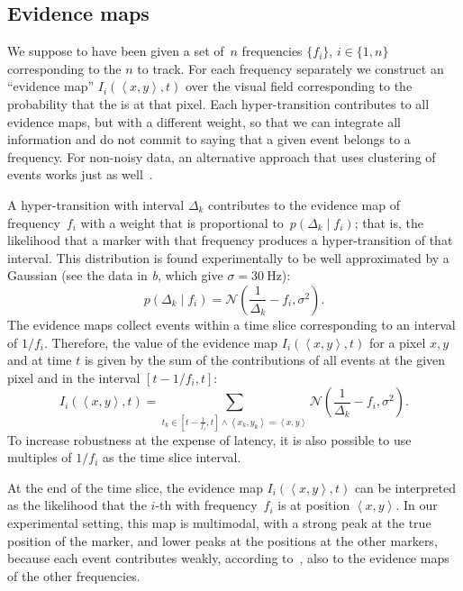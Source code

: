 \subsection{Evidence maps}

We suppose to have been given a set of~$n$ frequencies $\{f_{i}\}$,
$i\in\{1,n\}$ corresponding to the $n$ \ALMs to track. For each
frequency separately we construct an ``evidence map'' $I_{i}(\left\langle x,y\right\rangle ,t)$
over the visual field corresponding to the probability that the \ALM
is at that pixel. Each hyper-transition contributes to all evidence
maps, but with a different weight, so that we can integrate all information
and do not commit to saying that a given event belongs to a frequency.
For non-noisy data, an alternative approach that uses clustering of
events works just as well~\cite{Matthias}.

A hyper-transition with interval $\Delta_{k}$ contributes to the
evidence map of frequency~$f_{i}$ with a weight that is proportional
to~$p(\Delta_{k}\mid f_{i})$; that is, the likelihood that a marker
\ALM with that frequency produces a hyper-transition of that interval.
This distribution is found experimentally to be well approximated
by a Gaussian (see the data in \emph{b},
which give $\sigma=30\ \mbox{Hz}$): 
\begin{equation}
p(\Delta_{k}\mid f_{i})=\mathcal{N}\left(\frac{1}{\Delta_{k}}-f_{i},\sigma^{2}\right).\label{eq:lik_delta}
\end{equation}
The evidence maps collect events within a time slice corresponding
to an interval of $1/f_{i}$. Therefore, the value of the evidence
map $I_{i}(\left\langle x,y\right\rangle ,t)$ for a pixel $x,y$
and at time $t$ is given by the sum of the contributions of all events
at the given pixel and in the interval $\left[t-1/f_{i},t\right]$:
\[
I_{i}(\left\langle x,y\right\rangle ,t)=\sum_{t_{k}\in\left[t-\frac{1}{f_{i}},t\right]\wedge\left\langle x_{k},y_{k}\right\rangle =\left\langle x,y\right\rangle }\mathcal{N}\left(\frac{1}{\Delta_{k}}-f_{i},\sigma^{2}\right).
\]
To increase robustness at the expense of latency, it is also possible
to use multiples of $1/f_{i}$ as the time slice interval.

At the end of the time slice, the evidence map $I_{i}(\left\langle x,y\right\rangle ,t)$
can be interpreted as the likelihood that the $i$-th \ALM with frequency~$f_{i}$
is at position $\left\langle x,y\right\rangle $. In our experimental
setting, this map is multimodal, with a strong peak at the true position
of the marker, and lower peaks at the positions at the other markers,
because each event contributes weakly, according to~,
also to the evidence maps of the other frequencies. 

